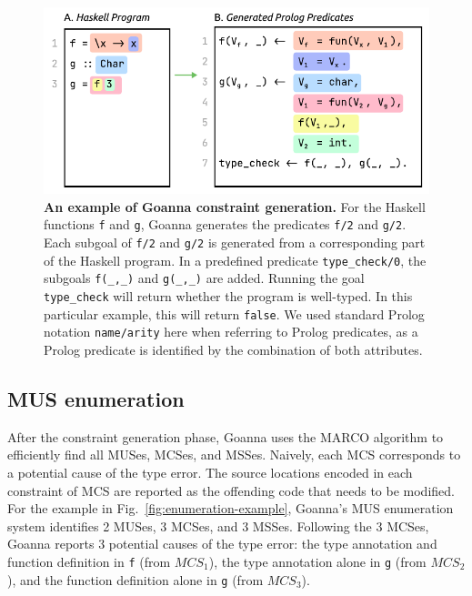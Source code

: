 \documentclass[pdflatex,lineno,sn-nature,Numbered]{sn-jnl}%
\begin{document}
  \begin{figure}[htb]
        \centering
    \includegraphics[width=0.7\linewidth]{images/Translation-Example}
        \caption[An example of Goanna constraint generation]{\textbf{An example of Goanna constraint generation.} For the Haskell functions \texttt{f} and \texttt{g}, Goanna generates the predicates \texttt{f/2} and \texttt{g/2}. Each subgoal of \texttt{f/2} and \texttt{g/2} is generated from a corresponding part of the Haskell program. In a predefined predicate \texttt{type\_check/0}, the subgoals \texttt{f(\_,\_)} and \texttt{g(\_,\_)} are added. Running the goal \texttt{type\_check} will return whether the program is well-typed. In this particular example, this will return \texttt{false}. We used standard Prolog notation \texttt{name/arity} here when referring to Prolog predicates, as a Prolog predicate is identified by the combination of both attributes. 
}
        \label{fig:translation-example}
    \end{figure}
    

    \subsection{MUS enumeration} \label{sub:enumeration}
 After the constraint generation phase,  Goanna uses the MARCO algorithm \cite{Liffiton2016-xi} to efficiently find all MUSes, MCSes, and MSSes. Naively, each MCS corresponds to a potential cause of the type error. The source locations encoded in each constraint of MCS are reported as the offending code that needs to be modified. For the example in Fig.~\ref{fig:enumeration-example}, Goanna's MUS enumeration system identifies 2 MUSes, 3 MCSes, and 3 MSSes. Following the 3 MCSes, Goanna reports 3 potential causes of the type error: the type annotation and function definition in \texttt{f} (from $MCS_1$), the type annotation alone in \texttt{g} (from $MCS_2$), and the function definition alone in \texttt{g} (from $MCS_3$). 
 
\end{document}
